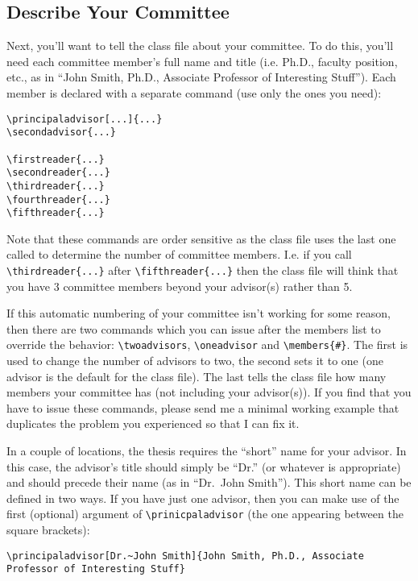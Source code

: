 \subsection{Describe Your Committee}\label{comm}
Next, you'll want to tell the class file about your committee.  To do this, you'll need each committee member's full name and title (i.e. Ph.D., faculty position, etc., as in ``John Smith, Ph.D., Associate Professor of Interesting Stuff'').  Each member is declared with a separate command (use only the ones you need):

\begin{verbatim}
\principaladvisor[...]{...}
\secondadvisor{...}

\firstreader{...}
\secondreader{...}
\thirdreader{...}
\fourthreader{...}
\fifthreader{...}
\end{verbatim}

Note that these commands are order sensitive as the class file uses the last one called to determine the number of committee members.  I.e. if you call \verb=\thirdreader{...}= after \verb=\fifthreader{...}= then the class file will think that you have 3 committee members beyond your advisor(s) rather than 5.

If this automatic numbering of your committee isn't working for some reason, then there are two commands which you can issue after the members list to override the behavior: \verb=\twoadvisors=, \verb=\oneadvisor= and \verb=\members{#}=.  The first is used to change the number of advisors to two, the second sets it to one (one advisor is the default for the class file).  The last tells the class file how many members your committee has (not including your advisor(s)).  If you find that you have to issue these commands, please send me a minimal working example that duplicates the problem you experienced so that I can fix it.

In a couple of locations, the thesis requires the ``short'' name for your advisor.  In this case, the advisor's title should simply be ``Dr.'' (or whatever is appropriate) and should precede their name (as in ``Dr.~John Smith'').  This short name can be defined in two ways.  If you have just one advisor, then you can make use of the first (optional) argument of \verb=\prinicpaladvisor= (the one appearing between the square brackets):

\begin{verbatim}
\principaladvisor[Dr.~John Smith]{John Smith, Ph.D., Associate Professor of Interesting Stuff}
\end{verbatim}

